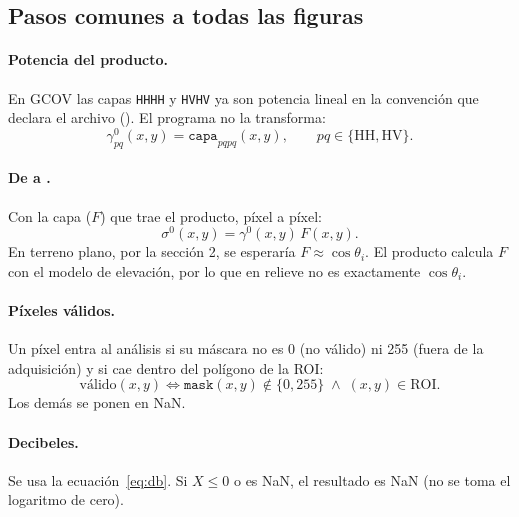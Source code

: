 \documentclass[11pt,a4paper]{article}
\begin{document}
\subsection{Pasos comunes a todas las figuras}

\paragraph{Potencia del producto.} En GCOV las capas \texttt{HHHH} y \texttt{HVHV} ya son potencia lineal en la convención que declara
el archivo (). El programa no la transforma:
\begin{equation}
  \gamma^0_{pq}(x,y) = \texttt{capa}_{pqpq}(x,y), \qquad pq \in \{\text{HH}, \text{HV}\}.
\end{equation}

\paragraph{De \gz{} a \sz.} Con la capa  ($F$) que trae el producto, píxel a píxel:
\begin{equation}
  \sigma^0(x,y) = \gamma^0(x,y)\, F(x,y).
  \label{eq:gamma-sigma}
\end{equation}
En terreno plano, por la sección 2, se esperaría $F \approx \cos\theta_i$. El producto calcula $F$ con el modelo de elevación, por lo
que en relieve no es exactamente $\cos\theta_i$.

\paragraph{Píxeles válidos.} Un píxel entra al análisis si su máscara no es 0 (no válido) ni 255 (fuera de la adquisición) y si cae
dentro del polígono de la ROI:
\begin{equation}
  \text{válido}(x,y) \iff \texttt{mask}(x,y) \notin \{0, 255\} \;\wedge\; (x,y) \in \text{ROI}.
\end{equation}
Los demás se ponen en NaN.

\paragraph{Decibeles.} Se usa la ecuación~\eqref{eq:db}. Si $X \le 0$ o es NaN, el resultado es NaN (no se toma el logaritmo de
cero).
\end{document}
